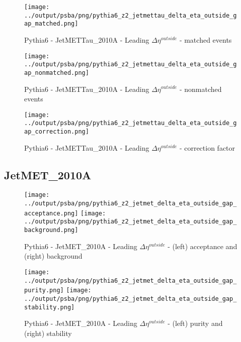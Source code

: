 \documentclass[11pt]{book}
\begin{document}
\begin{figure}[ht]
\centering
\texttt{[image: ../output/psba/png/pythia6\_z2\_jetmettau\_delta\_eta\_outside\_gap\_matched.png]}
\caption{Pythia6 - JetMETTau\_2010A - Leading $\Delta\eta^{outside}$ - matched events}
\label{fig:p6_jetmettau_delta_eta_outside_gap_matched}
\end{figure}

\begin{figure}[ht]
\centering
\texttt{[image: ../output/psba/png/pythia6\_z2\_jetmettau\_delta\_eta\_outside\_gap\_nonmatched.png]}
\caption{Pythia6 - JetMETTau\_2010A - Leading $\Delta\eta^{outside}$ - nonmatched events}
\label{fig:p6_jetmettau_delta_eta_outside_gap_nonmatched}
\end{figure}

\begin{figure}[ht]
\centering
\texttt{[image: ../output/psba/png/pythia6\_z2\_jetmettau\_delta\_eta\_outside\_gap\_correction.png]}
\caption{Pythia6 - JetMETTau\_2010A - Leading $\Delta\eta^{outside}$ - correction factor}
\label{fig:p6_jetmettau_delta_eta_outside_gap_correction}
\end{figure}



\clearpage
\subsection{JetMET\_2010A}

\begin{figure}[ht]
\centering
\texttt{[image: ../output/psba/png/pythia6\_z2\_jetmet\_delta\_eta\_outside\_gap\_acceptance.png]}
\texttt{[image: ../output/psba/png/pythia6\_z2\_jetmet\_delta\_eta\_outside\_gap\_background.png]}
\caption{Pythia6 - JetMET\_2010A - Leading $\Delta\eta^{outside}$ - (left) acceptance and (right) background}
\label{fig:p6_jetmet_delta_eta_outside_gap_ab}
\end{figure}

\begin{figure}[ht]
\centering
\texttt{[image: ../output/psba/png/pythia6\_z2\_jetmet\_delta\_eta\_outside\_gap\_purity.png]}
\texttt{[image: ../output/psba/png/pythia6\_z2\_jetmet\_delta\_eta\_outside\_gap\_stability.png]}
\caption{Pythia6 - JetMET\_2010A - Leading $\Delta\eta^{outside}$ - (left) purity and (right) stability}
\label{fig:p6_jetmet_delta_eta_outside_gap_ps}
\end{figure}
\end{document}
